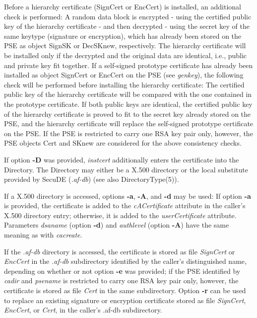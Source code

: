 Before a hierarchy certificate (SignCert or EncCert) is installed, an additional check is 
performed:
A random data block is encrypted - using the certified public key of the hierarchy certificate - and then 
decrypted
- using the secret key of the same keytype (signature or encryption), which has already been stored on the 
PSE 
as object SignSK or DecSKnew, respectively. The hierarchy certificate will
be installed only if the decrypted and the original data are identical, i.e., public and private key fit
together.
If a self-signed prototype certificate has already been installed as object SignCert or EncCert
on the PSE (see {\em genkey}), the following check will be performed before installing the hierarchy 
certificate: 
The certified public key of the hierarchy certificate will be compared with the one contained in the prototype 
certificate. If both public keys are identical, the certified public key of the hierarchy certificate is proved to
fit to the secret key already stored on the PSE, and the hierarchy certificate will replace the self-signed
prototype certificate on the PSE.
If the PSE is restricted to carry one RSA key pair only, however, the PSE objects Cert and SKnew are 
considered for the above consistency checks.
 
If option {\bf -D} was provided, {\em instcert} additionally enters the certificate into the Directory. 
The Directory may either be a X.500 directory or the local substitute provided by 
SecuDE ({\em .af-db}) (see also DirectoryType(5)).

If a X.500 directory is accessed, options {\bf -a}, {\bf -A}, and {\bf -d} may be used:
If option {\bf -a} is provided, the certificate is added to the {\em cACertificate} attribute in
the caller's X.500 directory entry; otherwise, it is added to the {\em userCertificate}
attribute.
Parameters {\em dsaname} (option {\bf -d}) and {\em authlevel} (option {\bf -A}) have the same meaning as with {\em cacreate}.
 
If the {\em .af-db} directory is accessed, the certificate is stored as file {\em SignCert}
or {\em EncCert} in the {\em .af-db} subdirectory identified by the caller's distinguished name,
depending on whether or not option {\bf -e} was provided; if the PSE identified by 
{\em cadir} and {\em psename} is restricted to carry one RSA key pair only, 
however, the certificate is stored as file {\em Cert} in the same subdirectory.
Option {\bf -r} can be used to replace an existing 
signature or encryption certificate stored as file {\em SignCert}, {\em EncCert}, or {\em Cert},
in the caller's .af-db subdirectory.

